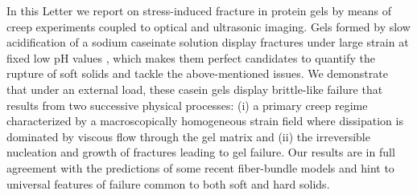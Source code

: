 \documentclass[twocolumn,superscriptaddress,showpacs,preprintnumbers,amsmath,amssymb,prl]{revtex4}
\begin{document}
In this Letter we report on stress-induced fracture in protein gels by means of creep experiments coupled to optical and ultrasonic imaging. Gels formed by slow acidification of a sodium caseinate solution display fractures under large strain at fixed low pH values \cite{vanVliet:1995,Lucey:1998}, which makes them perfect candidates to quantify the rupture of soft solids and tackle the above-mentioned issues. We demonstrate that under an external load, these casein gels display brittle-like failure that results from two successive physical processes: (i) a primary creep regime characterized by a macroscopically homogeneous strain field where dissipation is dominated by viscous flow through the gel matrix and (ii) the irreversible nucleation and growth of fractures leading to gel failure. Our results are in full agreement with the predictions of some recent fiber-bundle models and hint to universal features of failure common to both soft and hard solids.
\end{document}
